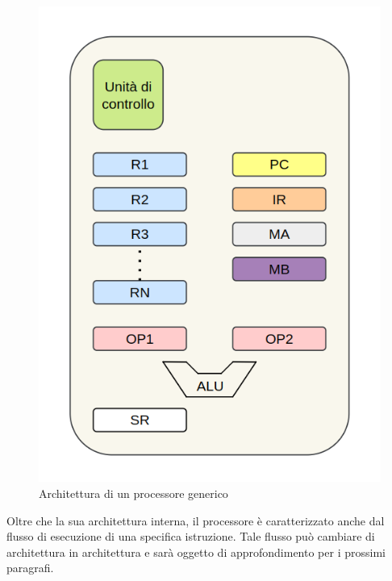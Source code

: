 \begin{figure}
    \centering
    \includegraphics[width=.5\textwidth]{img/processore.png}
    \caption{Architettura di un processore generico}\label{img:processore}
\end{figure}

Oltre che la sua architettura interna, il processore è caratterizzato anche dal flusso di esecuzione di una specifica istruzione. Tale flusso può cambiare di architettura in architettura e sarà oggetto di approfondimento per i prossimi paragrafi.